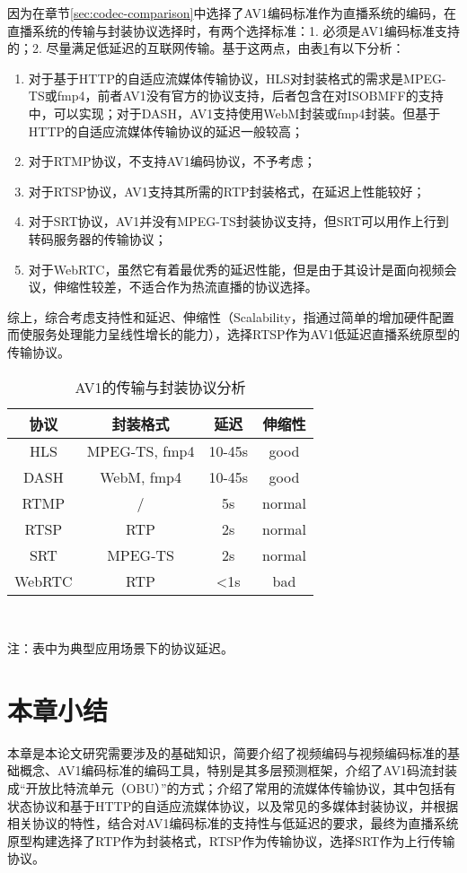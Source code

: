因为在章节\ref{sec:codec-comparison}中选择了AV1编码标准作为直播系统的编码，在直播系统的传输与封装协议选择时，有两个选择标准：1. 必须是AV1编码标准支持的；2. 尽量满足低延迟的互联网传输。基于这两点，由表\ref{tab:protocol}有以下分析：

\begin{enumerate} [label=\arabic*)]
  \item 对于基于HTTP的自适应流媒体传输协议，HLS对封装格式的需求是MPEG-TS或fmp4，前者AV1没有官方的协议支持，后者包含在对ISOBMFF的支持中，可以实现；对于DASH，AV1支持使用WebM封装或fmp4封装。但基于HTTP的自适应流媒体传输协议的延迟一般较高；
  \item 对于RTMP协议，不支持AV1编码协议，不予考虑；
  \item 对于RTSP协议，AV1支持其所需的RTP封装格式，在延迟上性能较好；
  \item 对于SRT协议，AV1并没有MPEG-TS封装协议支持，但SRT可以用作上行到转码服务器的传输协议；
  \item 对于WebRTC，虽然它有着最优秀的延迟性能，但是由于其设计是面向视频会议，伸缩性较差，不适合作为热流直播的协议选择。
\end{enumerate}

综上，综合考虑支持性和延迟、伸缩性（Scalability，指通过简单的增加硬件配置而使服务处理能力呈线性增长的能力），选择RTSP作为AV1低延迟直播系统原型的传输协议。

\begin{table}[!hpt]
  \caption{AV1的传输与封装协议分析}
  \label{tab:protocol}
  \centering
  \begin{tabular}{cccc} \toprule
    协议     & 封装格式       & 延迟     & 伸缩性\\ \midrule
    HLS     & MPEG-TS, fmp4 & 10-45s  & good  \\
    DASH    & WebM, fmp4    & 10-45s  & good  \\
    RTMP    & /             & 5s      & normal \\
    RTSP    & RTP           & 2s      & normal \\
    SRT     & MPEG-TS       & 2s      & normal \\
    WebRTC  & RTP           & <1s     & bad    \\ \bottomrule
  \end{tabular} \\ \raggedright \vspace{8pt} \qquad \qquad \qquad \qquad
	\small 注：表中为典型应用场景下的协议延迟。
\end{table}




\section{本章小结}

本章是本论文研究需要涉及的基础知识，简要介绍了视频编码与视频编码标准的基础概念、AV1编码标准的编码工具，特别是其多层预测框架，介绍了AV1码流封装成“开放比特流单元（OBU）”的方式；介绍了常用的流媒体传输协议，其中包括有状态协议和基于HTTP的自适应流媒体协议，以及常见的多媒体封装协议，并根据相关协议的特性，结合对AV1编码标准的支持性与低延迟的要求，最终为直播系统原型构建选择了RTP作为封装格式，RTSP作为传输协议，选择SRT作为上行传输协议。